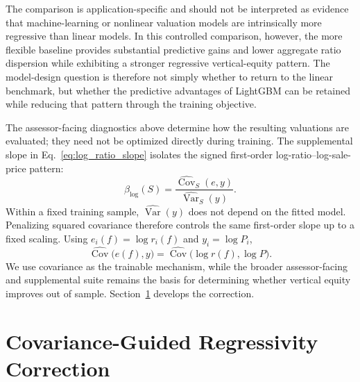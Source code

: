 \documentclass[10pt]{article}
\theoremstyle{definition}
\newcommand{\1}{\mathbf{1}}
\begin{document}
{The comparison is application-specific and should not be interpreted as evidence that machine-learning or nonlinear valuation models are intrinsically more regressive than linear models. In this controlled comparison, however, the more flexible baseline provides substantial predictive gains and lower aggregate ratio dispersion while exhibiting a stronger regressive vertical-equity pattern. The model-design question is therefore not simply whether to return to the linear benchmark, but whether the predictive advantages of LightGBM can be retained while reducing that pattern through the training objective.}


{The assessor-facing diagnostics above determine how the resulting valuations are evaluated; they need not be optimized directly during training. The supplemental slope in Eq.~\eqref{eq:log_ratio_slope} isolates the signed first-order log-ratio--log-sale-price pattern:
\[
\beta_{\log}(S)
=
\frac{\widehat{\operatorname{Cov}}_S(e,y)}
{\widehat{\operatorname{Var}}_S(y)}.
\]
Within a fixed training sample, $\widehat{\operatorname{Var}}(y)$ does not depend on the fitted model. Penalizing squared covariance therefore controls the same first-order slope up to a fixed scaling. Using $e_i(f)=\log r_i(f)$ and $y_i=\log P_i$,
\begin{equation}
\label{eq:training_covariance_bridge}
\widehat{\operatorname{Cov}}\bigl(e(f),y\bigr)
=
\widehat{\operatorname{Cov}}\bigl(\log r(f),\log P\bigr).
\end{equation}
We use covariance as the trainable mechanism, while the broader assessor-facing and supplemental suite remains the basis for determining whether vertical equity improves out of sample. Section~\ref{sec:method} develops the correction.}



\section{Covariance-Guided Regressivity Correction}
\label{sec:method}

\end{document}
